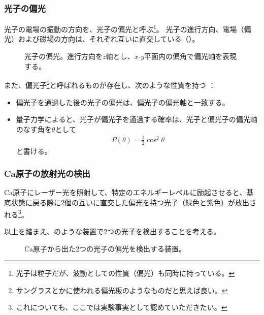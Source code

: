 \documentclass[10pt,b5paper,papersize,dvipdfmx]{jsbook}
\begin{document}
%
\subsubsection{光子の偏光} %

光子の電場の振動の方向を、光子の偏光と呼ぶ\footnote{
  光子は粒子だが、波動としての性質（偏光）も同時に持っている。
}。
光子の進行方向、電場（偏光）および磁場の方向は、それぞれ互いに直交している（）。

\begin{figure}[ht]
  \centering
  
  \caption{光子の偏光。進行方向を$z$軸とし、$x$-$y$平面内の偏角で偏光軸を表現する。}
  \label{fig:photon-henkou}
\end{figure}

\par
また、偏光子\footnote{
  サングラスとかに使われる偏光板のようなものだと思えば良い。
}と呼ばれるものが存在し、次のような性質を持つ
：
\begin{itemize}
  \item 偏光子を通過した後の光子の偏光は、偏光子の偏光軸と一致する。
  \item 量子力学によると、光子が偏光子を通過する確率は、光子と偏光子の偏光軸のなす角を$\theta$として
    \begin{align}
      P(\theta) = \frac12 \cos^2\theta
      \label{eq:P(theta)}
    \end{align}
    と書ける。
\end{itemize}

%
\subsubsection{Ca原子の放射光の検出} %

Ca原子にレーザー光を照射して、特定のエネルギーレベルに励起させると、基底状態に戻る際に2個の互いに直交した偏光を持つ光子（緑色と紫色）が放出される\footnote{
  これについても、ここでは実験事実として認めていただきたい。
}。\par
以上を踏まえ、のような装置で2つの光子を検出することを考える。

\begin{figure}[htb]
  \centering
  
  \caption{Ca原子から出た2つの光子の偏光を検出する装置。}
  \label{fig:detectors}
\end{figure}
\end{document}
